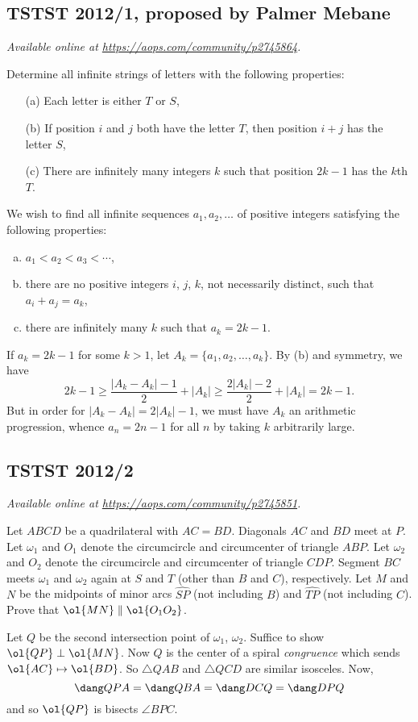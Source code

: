\documentclass[11pt]{scrartcl}
\begin{document}
\subsection{TSTST 2012/1, proposed by Palmer Mebane}
\textsl{Available online at \url{https://aops.com/community/p2745864}.}
\begin{mdframed}[style=mdpurplebox,frametitle={Problem statement}]
Determine all infinite strings of letters with the following properties:
\begin{enumerate}
  \item[(a)] Each letter is either $T$ or $S$,
  \item[(b)] If position $i$ and $j$ both have the letter $T$,
    then position $i+j$ has the letter $S$,
  \item[(c)] There are infinitely many integers $k$ such that position $2k-1$ has the $k$th $T$.
\end{enumerate}
\end{mdframed}
We wish to find all infinite sequences $a_1, a_2, \dots$
of positive integers satisfying the following properties:
 \begin{enumerate}[(a)]
  \item $a_1 < a_2 < a_3 < \dotsb$,
  \item there are no positive integers $i$, $j$, $k$, not necessarily distinct, such that $a_i+a_j=a_k$,
  \item there are infinitely many $k$ such that $a_k = 2k-1$.
 \end{enumerate}

If $a_k=2k-1$ for some $k>1$, let $A_k=\{a_1,a_2,\dots,a_k\}$.
By (b) and symmetry, we have
\[ 2k-1
  \ge \frac{|A_k-A_k|-1}{2}+|A_k|
  \ge \frac{2|A_k|-2}{2}+|A_k| = 2k-1. \]
But in order for $|A_k-A_k|=2|A_k|-1$,
we must have $A_k$ an arithmetic progression,
whence $a_n=2n-1$ for all $n$ by taking $k$ arbitrarily large.
\pagebreak

\subsection{TSTST 2012/2}
\textsl{Available online at \url{https://aops.com/community/p2745851}.}
\begin{mdframed}[style=mdpurplebox,frametitle={Problem statement}]
Let $ABCD$ be a quadrilateral with $AC = BD$.
Diagonals $AC$ and $BD$ meet at $P$.
Let $\omega_1$ and $O_1$ denote the circumcircle and
circumcenter of triangle $ABP$.
Let $\omega_2$ and $O_2$ denote the circumcircle and
circumcenter of triangle $CDP$.
Segment $BC$ meets $\omega_1$ and $\omega_2$ again at $S$ and $T$
(other than $B$ and $C$), respectively.
Let $M$ and $N$ be the midpoints of minor arcs
$\widehat {SP}$ (not including $B$)
and $\widehat {TP}$ (not including $C$).
Prove that $\ol{MN} \parallel \ol{O_1O_2}$.
\end{mdframed}
Let $Q$ be the second intersection point of $\omega_1$, $\omega_2$.
Suffice to show $\ol{QP} \perp \ol{MN}$.
Now $Q$ is the center of a spiral \emph{congruence}
which sends $\ol{AC} \mapsto \ol{BD}$.
So $\triangle QAB$ and $\triangle QCD$ are similar isosceles.
Now, \[ \dang QPA = \dang QBA = \dang DCQ = \dang DPQ \]
and so $\ol{QP}$ is bisects $\angle BPC$.
\end{document}
